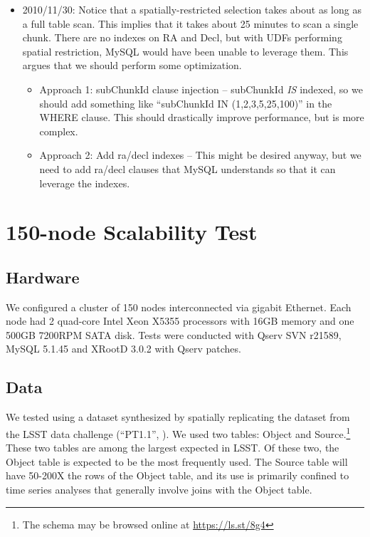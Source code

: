 \documentclass[DM,toc]{lsstdoc}
\begin{document}
\begin{itemize}
\item
  2010/11/30: Notice that a spatially-restricted selection takes about
  as long as a full table scan. This implies that it takes about 25
  minutes to scan a single chunk. There are no indexes on RA and Decl,
  but with UDFs performing spatial restriction, MySQL would have been
  unable to leverage them. This argues that we should perform some
  optimization.

  \begin{itemize}
  \item
    Approach 1: subChunkId clause injection -- subChunkId \emph{IS} indexed,
    so we should add something like ``subChunkId IN (1,2,3,5,25,100)''
    in the WHERE clause. This should drastically improve performance,
    but is more complex.
  \item
    Approach 2: Add ra/decl indexes -- This might be desired anyway,
    but we need to add ra/decl clauses that MySQL understands so that it
    can leverage the indexes.
  \end{itemize}
\end{itemize}


\section{150-node Scalability Test}\label{node-scalability-test}

\subsection{Hardware}\label{hardware-150}

We configured a cluster of 150 nodes interconnected via gigabit
Ethernet. Each node had 2 quad-core Intel Xeon X5355 processors with
16GB memory and one 500GB 7200RPM SATA disk. Tests were conducted with
Qserv SVN r21589, MySQL 5.1.45 and XRootD
3.0.2 with Qserv patches.

\subsection{Data}\label{data}

We tested using a dataset synthesized by spatially replicating the
dataset from the LSST data challenge (``PT1.1'', ). We used two tables:
Object and Source.\footnote{The schema may be browsed online at
  \url{https://ls.st/8g4}} These
two tables are among the largest expected in LSST. Of these two, the
Object table is expected to be the most frequently used. The Source
table will have 50-200X the rows of the Object table, and its use is
primarily confined to time series analyses that generally involve joins
with the Object table.
\end{document}
